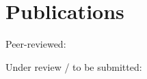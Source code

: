 \chapter*{Publications}

\noindent
Peer-reviewed:
\begin{refsection}[ownpubs]
  \small%
  \nocite{*}
  \printbibliography[heading=none,type=article]
\end{refsection}

\noindent
Under review / to be submitted:
\begin{refsection}[ownpubs]
  \small%
  \nocite{*}
  \printbibliography[heading=none, type=inproceedings]
\end{refsection}
